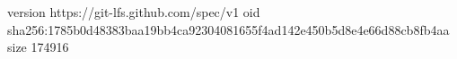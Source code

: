 version https://git-lfs.github.com/spec/v1
oid sha256:1785b0d48383baa19bb4ca92304081655f4ad142e450b5d8e4e66d88cb8fb4aa
size 174916
